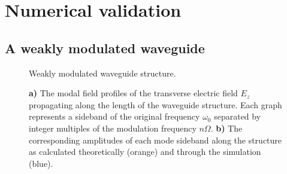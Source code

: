 %		
%		


\section{Numerical validation}

\subsection{A weakly modulated waveguide}
\begin{figure}[t]
\centering
\setlength{\figH}{1\textwidth}
\setlength{\figW}{1\textwidth}

\caption[The modulated waveguide structure]{Weakly modulated waveguide structure.}
\label{fig:weakmod}
\end{figure}


\begin{figure}
    \centering
    \setlength{\figH}{1\linewidth}
	\setlength{\figW}{1\textwidth}
    \begin{subfigure}[t]{0.5\textwidth}
		
    \end{subfigure}%
    \begin{subfigure}[t]{0.5\textwidth}
		
    \end{subfigure}
    \caption{\textbf{a)} The modal field profiles of the transverse electric field $E_z$ propagating along the length of the waveguide structure. Each graph represents a sideband of the original frequency $\omega_0$ separated by integer multiples of the modulation frequency $n \Omega$. \textbf{b)} The corresponding amplitudes of each mode sideband along the structure as calculated theoretically (orange) and through the simulation (blue).}
    \label{fig:weakMod}
\end{figure}

